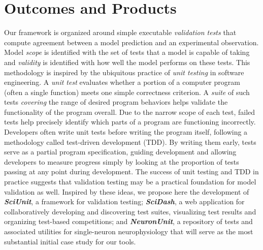 \documentclass[11pt,letterpaper]{article}
\begin{document}
\section{Outcomes and Products}
Our framework is organized around simple executable \emph{validation tests} that compute agreement between a model prediction and an experimental observation. Model \textit{scope} is identified with the set of tests that a model is capable of taking and \textit{validity} is identified with how well the model performs on these tests. This methodology is inspired by the ubiquitous practice of \emph{unit testing} in software engineering. A \emph{unit test} evaluates whether a portion of a computer program (often a single function) meets one simple correctness criterion. A \textit{suite} of such tests \emph{covering} the range of desired program behaviors helps validate the functionality of the program overall. Due to the narrow scope of each test, failed tests help precisely identify which parts of a program are functioning incorrectly. Developers often write unit tests before writing the program itself, following a methodology called test-driven development (TDD)\cite{beck2003}. By writing them early, tests serve as a partial program specification, guiding development and allowing developers to measure progress simply by looking at the proportion of tests passing at any point during development. 
The success of unit testing and TDD in practice suggests that validation testing may be a practical foundation for model validation as well.  Inspired by these ideas, we propose here the development of \textbf{\textit{SciUnit}}, a framework for validation testing; \textbf{\textit{SciDash}}, a web application for collaboratively developing and discovering test suites,  visualizing test results and organizing test-based competitions; and \textbf{\textit{NeuronUnit}}, a repository of tests and associated utilities for single-neuron neurophysiology that will serve as the most substantial initial case study for our tools.
\end{document}
